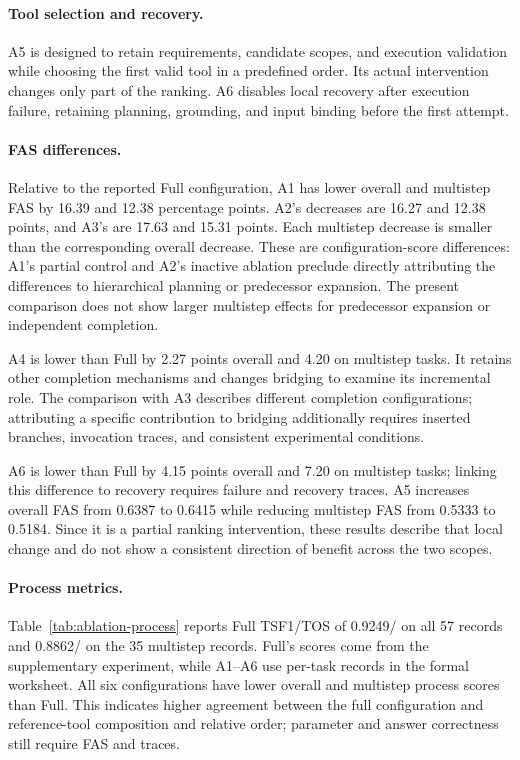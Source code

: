 \paragraph{Tool selection and recovery.}
A5 is designed to retain requirements, candidate scopes, and execution validation while choosing the first valid tool in a predefined order. Its actual intervention changes only part of the ranking. A6 disables local recovery after execution failure, retaining planning, grounding, and input binding before the first attempt.



\paragraph{FAS differences.}
Relative to the reported Full configuration, A1 has lower overall and multistep FAS by 16.39 and 12.38 percentage points. A2's decreases are 16.27 and 12.38 points, and A3's are 17.63 and 15.31 points. Each multistep decrease is smaller than the corresponding overall decrease. These are configuration-score differences: A1's partial control and A2's inactive ablation preclude directly attributing the differences to hierarchical planning or predecessor expansion. The present comparison does not show larger multistep effects for predecessor expansion or independent completion.

A4 is lower than Full by 2.27 points overall and 4.20 on multistep tasks. It retains other completion mechanisms and changes bridging to examine its incremental role. The comparison with A3 describes different completion configurations; attributing a specific contribution to bridging additionally requires inserted branches, invocation traces, and consistent experimental conditions.

A6 is lower than Full by 4.15 points overall and 7.20 on multistep tasks; linking this difference to recovery requires failure and recovery traces. A5 increases overall FAS from 0.6387 to 0.6415 while reducing multistep FAS from 0.5333 to 0.5184. Since it is a partial ranking intervention, these results describe that local change and do not show a consistent direction of benefit across the two scopes.

\paragraph{Process metrics.}
Table~\ref{tab:ablation-process} reports Full TSF1/TOS of 0.9249/ on all 57 records and 0.8862/ on the 35 multistep records. Full's scores come from the supplementary experiment, while A1--A6 use per-task records in the formal worksheet. All six configurations have lower overall and multistep process scores than Full. This indicates higher agreement between the full configuration and reference-tool composition and relative order; parameter and answer correctness still require FAS and traces.


